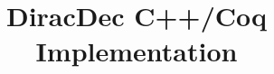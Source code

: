 \documentclass{article}
\title{\textbf{DiracDec C++/Coq Implementation\cite{ExampleCitation}}}
\begin{document}
\maketitle


\newcommand{\reduce}{\triangleright}

\newcommand{\Sort}{\mathsf{Sort}}
\newcommand{\WF}{\mathcal{WF}}

\newcommand{\Index}{\mathsf{Index}}
\newcommand{\Type}{\mathsf{Type}}
\newcommand{\Basis}{\mathsf{Basis}}

\newcommand{\SType}{\mathcal{S}}
\newcommand{\KType}{\mathcal{K}}
\newcommand{\BType}{\mathcal{B}}
\newcommand{\OType}{\mathcal{O}}
\newcommand{\SET}{\mathsf{Set}}

\newcommand{\ZEROK}{\mathbf{0}_\mathcal{K}}
\newcommand{\ZEROB}{\mathbf{0}_\mathcal{B}}
\newcommand{\ZEROO}{\mathbf{0}_\mathcal{O}}

\newcommand{\PAIR}{\mathsf{PAIR}}

\newcommand{\ZERO}{\mathsf{0}}
\newcommand{\ONE}{\mathsf{1}}
\newcommand{\ADDS}{\mathsf{ADDS}}
\newcommand{\ADD}{\mathsf{ADD}}
\newcommand{\MULS}{\mathsf{MULS}}
\newcommand{\MUL}{\mathsf{MUL}}
\newcommand{\CONJ}{\mathsf{CONJ}}
\newcommand{\CJG}{\mathsf{CJG}}
\newcommand{\ADJ}{\mathsf{ADJ}}
\newcommand{\DELTA}{\mathsf{DELTA}}
\newcommand{\DOT}{\mathsf{DOT}}
\newcommand{\SCR}{\mathsf{SCR}}
\newcommand{\TSR}{\mathsf{TSR}}
\newcommand{\KET}{\mathsf{KET}}
\newcommand{\BRA}{\mathsf{BRA}}
\newcommand{\ONEO}{\mathbf{1}_\mathcal{O}}
\newcommand{\OUTER}{\mathsf{OUTER}}
\newcommand{\MULK}{\mathsf{MULK}}
\newcommand{\MULB}{\mathsf{MULB}}
\newcommand{\MULO}{\mathsf{MULO}}

\end{document}
